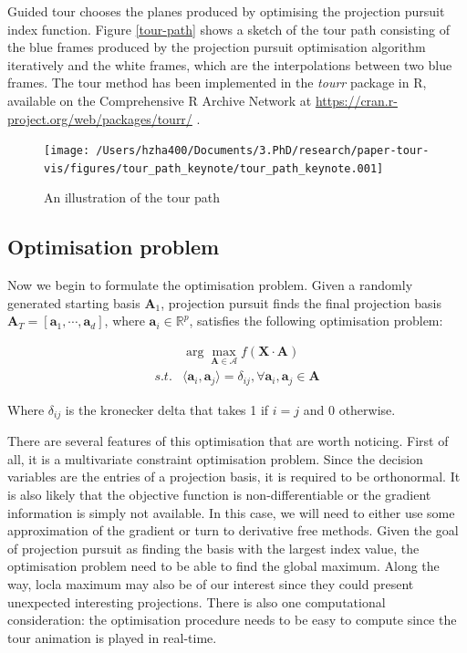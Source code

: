 \documentclass[12pt]{article}
\begin{document}
Guided tour chooses the planes produced by optimising the projection
pursuit index function. Figure \ref{tour-path} shows a sketch of the
tour path consisting of the blue frames produced by the projection
pursuit optimisation algorithm iteratively and the white frames, which
are the interpolations between two blue frames. The tour method has been
implemented in the \emph{tourr} package in R, available on the
Comprehensive R Archive Network at
\url{https://cran.r-project.org/web/packages/tourr/}
\citep{wickham2011tourrpackage}.

\begin{figure}
\texttt{[image: /Users/hzha400/Documents/3.PhD/research/paper-tour-vis/figures/tour\_path\_keynote/tour\_path\_keynote.001]} \caption{\label{tour-path}An illustration of the tour path}\label{fig:tour-path}
\end{figure}

\newpage

\hypertarget{tour-optim}{%
\subsection{Optimisation problem}\label{tour-optim}}

Now we begin to formulate the optimisation problem. Given a randomly
generated starting basis \(\mathbf{A}_1\), projection pursuit finds the
final projection basis
\(\mathbf{A}_T = [\mathbf{a}_1, \cdots, \mathbf{a}_d]\), where
\(\mathbf{a}_i \in \mathbb{R}^{p}\), satisfies the following
optimisation problem:

\begin{align}
&\arg \max_{\mathbf{A} \in \mathcal{A}} f(\mathbf{X} \cdot \mathbf{A}) \\
s.t. &  \langle \mathbf{a}_i, \mathbf{a}_j \rangle = \delta_{ij}, \forall \mathbf{a}_i, \mathbf{a}_j \in \mathbf{A}
\end{align}

Where \(\delta_{ij}\) is the kronecker delta that takes 1 if \(i = j\)
and 0 otherwise.

There are several features of this optimisation that are worth noticing.
First of all, it is a multivariate constraint optimisation problem.
Since the decision variables are the entries of a projection basis, it
is required to be orthonormal. It is also likely that the objective
function is non-differentiable or the gradient information is simply not
available. In this case, we will need to either use some approximation
of the gradient or turn to derivative free methods. Given the goal of
projection pursuit as finding the basis with the largest index value,
the optimisation problem need to be able to find the global maximum.
Along the way, locla maximum may also be of our interest since they
could present unexpected interesting projections. There is also one
computational consideration: the optimisation procedure needs to be easy
to compute since the tour animation is played in real-time.
\end{document}
